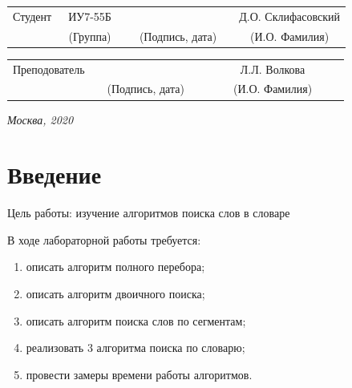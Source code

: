 \documentclass[14pt, a4paper]{extarticle}
\begin{document}
\noindent
{}
\\

\noindent
{}
\\

\vspace{1.5cm}
\noindent
\begin{tabular}{l c c c c c}
	Студент      & ~ИУ7-55Б~               & \hspace{2.5cm} & \hspace{2cm}                 & &  Д.О. Склифасовский \\\cline{2-2}\cline{4-4} \cline{6-6} 
	\hspace{3cm} & {\footnotesize(Группа)} &                & {\footnotesize(Подпись, дата)} & & {\footnotesize(И.О. Фамилия)}
\end{tabular}

\noindent
\begin{tabular}{l c c c c}
	Преподователь & \hspace{5cm}   & \hspace{2cm}                 & & ~~~~~~Л.Л. Волкова~~~~~~\\\cline{3-3} \cline{5-5} 
	\hspace{3cm}  &                & {\footnotesize(Подпись, дата)} & & {\footnotesize(И.О. Фамилия)}
\end{tabular}

\vspace{0.6cm}
\begin{center}	
	\vfill
	\large \textit {Москва, 2020}
\end{center}

\thispagestyle {empty}
\pagebreak

\clearpage
\tableofcontents

\clearpage
\section*{Введение}
Цель работы: изучение алгоритмов поиска слов в словаре\par
В ходе лабораторной работы требуется:
\begin{enumerate}
	\item[1)] описать алгоритм полного перебора;
	\item[2)] описать алгоритм двоичного поиска;
	\item[3)] описать алгоритм поиска слов по сегментам;
	\item[4)] реализовать 3 алгоритма поиска по словарю;
	\item[5)] провести замеры времени работы алгоритмов.
\end{enumerate}\par
\end{document}
